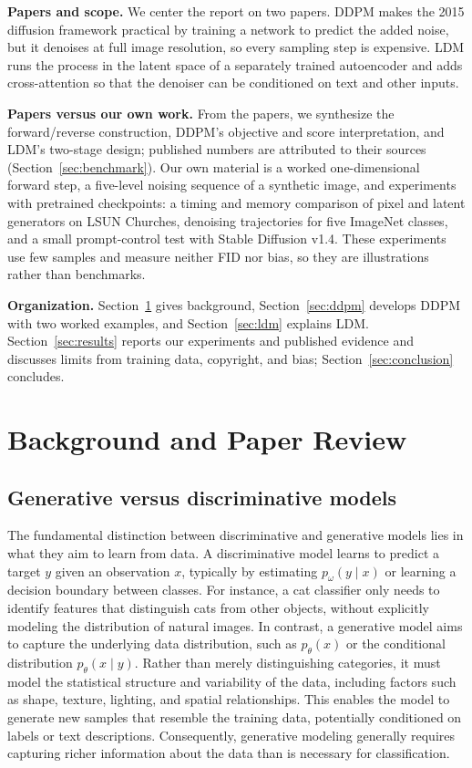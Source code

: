 \smallskip\noindent\textbf{Papers and scope.}
We center the report on two papers. DDPM \cite{ho2020ddpm} makes the 2015
diffusion framework \cite{sohl2015diffusion} practical by training a
network to predict the added noise, but it denoises at full image
resolution, so every sampling step is expensive. LDM
\cite{rombach2022ldm} runs the process in the latent space of a
separately trained autoencoder and adds cross-attention so that the
denoiser can be conditioned on text and other inputs.

\smallskip\noindent\textbf{Papers versus our own work.}
From the papers, we synthesize the forward/reverse construction, DDPM's
objective and score interpretation, and LDM's two-stage design; published
numbers are attributed to their sources (Section~\ref{sec:benchmark}).
Our own material is a worked one-dimensional forward step, a five-level
noising sequence of a synthetic image, and experiments with pretrained
checkpoints: a timing and memory comparison of pixel and latent
generators on LSUN Churches, denoising trajectories for five ImageNet
classes, and a small prompt-control test with Stable Diffusion v1.4. These
experiments use few samples and measure neither FID nor bias, so they are
illustrations rather than benchmarks.

\smallskip\noindent\textbf{Organization.}
Section~\ref{sec:background} gives background, Section~\ref{sec:ddpm}
develops DDPM with two worked examples, and Section~\ref{sec:ldm}
explains LDM. Section~\ref{sec:results} reports our experiments and
published evidence and discusses limits from training data, copyright,
and bias; Section~\ref{sec:conclusion} concludes.

\section{Background and Paper Review}\label{sec:background}

\subsection{Generative versus discriminative models}\label{sec:families}
The fundamental distinction between discriminative and generative models lies in what they aim to learn from data. 
A discriminative model learns to predict a target $y$ given an observation $x$, typically by estimating $p_\omega(y\mid x)$ or learning a decision boundary between classes. 
For instance, a cat classifier only needs to identify features that distinguish cats from other objects, without explicitly modeling the distribution of natural images.
In contrast, a generative model aims to capture the underlying data distribution, 
such as $p_\theta(x)$ or the conditional distribution $p_\theta(x\mid y)$. 
Rather than merely distinguishing categories, it must model the statistical structure and variability of the data, including factors such as shape, texture, lighting, and spatial relationships. This enables the model to generate new samples that resemble the training data, potentially conditioned on labels or text descriptions.
Consequently, generative modeling generally requires capturing richer information about the data than is necessary for classification.

